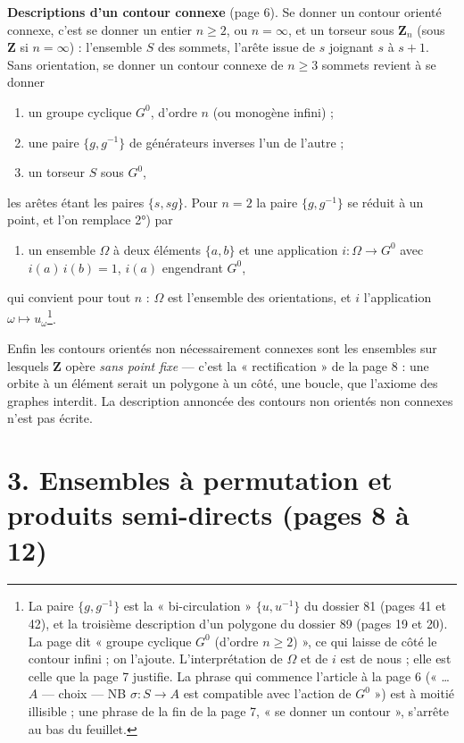 \documentclass[11pt,a4paper]{article}
\begin{document}
\textbf{Descriptions d'un contour connexe} (page 6). Se donner un contour
orienté connexe, c'est se donner un entier $n \geq 2$, ou $n = \infty$, et un
torseur sous $\mathbf{Z}_n$ (sous $\mathbf{Z}$ si $n = \infty$) : l'ensemble
$S$ des sommets, l'arête issue de $s$ joignant $s$ à $s + 1$. Sans orientation,
se donner un contour connexe de $n \geq 3$ sommets revient à se donner
\begin{enumerate}
\item[1°)] un groupe cyclique $G^0$, d'ordre $n$ (ou monogène infini) ;
\item[2°)] une paire $\{g, g^{-1}\}$ de générateurs inverses l'un de
l'autre ;
\item[3°)] un torseur $S$ sous $G^0$,
\end{enumerate}
les arêtes étant les paires $\{s, s g\}$. Pour $n = 2$ la paire $\{g, g^{-1}\}$
se réduit à un point, et l'on remplace 2°) par
\begin{enumerate}
\item[2 bis)] un ensemble $\Omega$ à deux éléments $\{a, b\}$ et une application
$i : \Omega \to G^0$ avec $i(a)\,i(b) = 1$, $i(a)$ engendrant $G^0$,
\end{enumerate}
qui convient pour tout $n$ : $\Omega$ est l'ensemble des orientations, et $i$
l'application $\omega \mapsto u_\omega$\footnote{La paire $\{g,
g^{-1}\}$ est la « bi-circulation » $\{u, u^{-1}\}$ du dossier 81 (pages 41
et 42), et la troisième description d'un polygone du dossier 89 (pages 19 et
20). La page dit « groupe cyclique
$G^0$ (d'ordre $n \geq 2$) », ce qui laisse de côté le contour infini ; on
l'ajoute. L'interprétation de $\Omega$ et de $i$ est de nous ; elle est celle
que la page 7 justifie. La phrase qui commence l'article à la page 6
(« \ldots{} $A$ --- choix --- NB $\sigma : S \to A$ est compatible avec
l'action de $G^0$ ») est à moitié illisible ; une phrase de la fin de la
page 7, « se donner un contour », s'arrête au bas du feuillet.}.

Enfin les contours orientés non nécessairement connexes sont les ensembles sur
lesquels $\mathbf{Z}$ opère \emph{sans point fixe} --- c'est la
« rectification » de la page 8 : une orbite à un élément serait un polygone à
un côté, une boucle, que l'axiome des graphes interdit. La description
annoncée des contours non orientés non connexes n'est pas écrite.

\section*{3. Ensembles à permutation et produits semi-directs (pages 8 à 12)}
\end{document}
